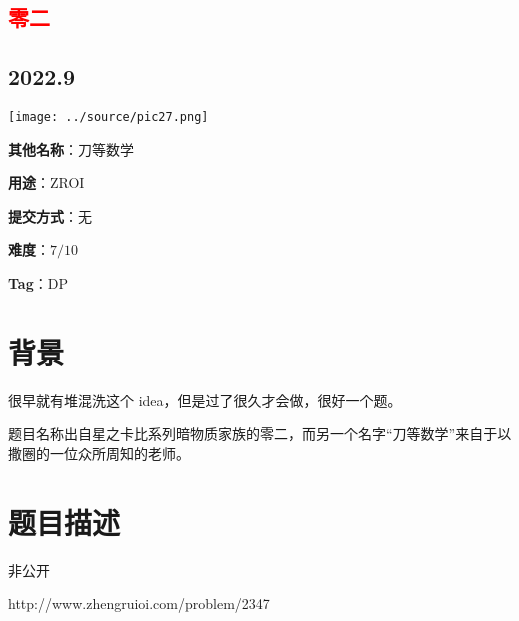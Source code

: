\documentclass[a4paper,10pt]{article}
\begin{document}
\vspace*{\fill}
\begin{center}

\section{\textcolor{red}{零二}}

\subsection*{2022.9}

\vspace{10pt}

\texttt{[image: ../source/pic27.png]}

\vspace{10pt}

\textbf{其他名称}：刀等数学

\vspace{10pt}

\textbf{用途}：ZROI

\vspace{10pt}

\textbf{提交方式}：无

\vspace{10pt}

\textbf{难度}：$7/10$

\vspace{10pt}

\textbf{Tag}：DP

\end{center}
\vspace*{\fill}

\newpage

\section*{背景}

很早就有堆混洗这个 idea，但是过了很久才会做，很好一个题。

题目名称出自星之卡比系列暗物质家族的零二，而另一个名字“刀等数学”来自于以撒圈的一位众所周知的老师。

\section*{题目描述}

非公开

http://www.zhengruioi.com/problem/2347

\newpage
\end{document}
